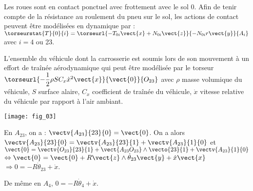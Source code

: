 \begin{multicols}{2}
Les roues sont en contact ponctuel avec frottement avec le sol 0. Afin de tenir compte de la résistance au roulement du pneu sur le sol, les actions de contact peuvent être modélisées en dynamique par : 
$\torseurstat{T}{0}{i}=\torseurl{-T_{0i}\vect{x}+N_{0i}\vect{z}}{-N_{0i}r\vect{y}}{A_i}$ avec $i=4$ ou 23.

L’ensemble du véhicule dont la carrosserie est soumis lors de son mouvement à un effort de traînée aérodynamique qui peut être modélisée par le torseur 
$\torseurl{-\dfrac{1}{2}\rho S C_x \dot{x}^2 \vect{x}}{\vect{0}}{O_{23}}$ avec $\rho$ masse volumique du véhicule, $S$ surface alaire, $C_x$ coefficient de traînée du véhicule, $\dot{x}$ vitesse relative du véhicule par rapport à l'air ambiant. 


\begin{center}
\texttt{[image: fig\_03]}
\end{center}
\fi

\ifprof
\begin{corrige}
En $A_{23}$, on a : $\vectv{A_{23}}{23}{0}=\vect{0}$. On a alors $\vectv{A_{23}}{23}{0}=\vectv{A_{23}}{23}{1}+\vectv{A_{23}}{1}{0}$ et $\vect{0}=\vectv{O_{23}}{23}{1}+\vect{A_{23}O_{23}}\wedge \vecto{23}{1}+\vectv{A_{23}}{1}{0} $ $\Leftrightarrow \vect{0}=\vect{0}+R\vect{z}\wedge \dot{\theta}_{23}\vect{y} + \dot{x}\vect{x}$ $\Rightarrow 0=-R \dot{\theta}_{23} + \dot{x}$.

De même en $A_4$, $0=-R \dot{\theta}_{4} + \dot{x}$.
\end{corrige}
\else
\fi


\end{multicols}
